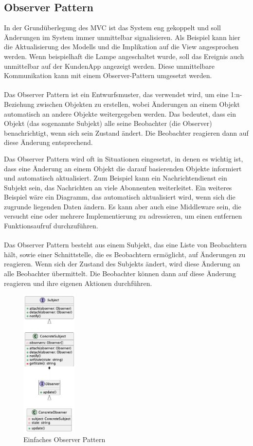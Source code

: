 \documentclass[../vs-script-first-v01.tex]{subfiles}
\begin{document}
\subsection{Observer Pattern}
In der Grundüberlegung des MVC ist das System eng gekoppelt und soll Änderungen im System immer unmittelbar signalisieren. Als Beispiel kann hier die Aktualisierung des Modells und die Implikation auf die View angesprochen werden. 
Wenn beispielhaft die Lampe angeschaltet wurde, soll das Ereignis auch unmittelbar auf der KundenApp angezeigt werden. 
Diese unmittelbare Kommunikation kann mit einem Observer-Pattern umgesetzt werden. 
\\\\
Das Observer Pattern ist ein Entwurfsmuster, das verwendet wird, um eine 1:n-Beziehung zwischen Objekten zu erstellen, wobei Änderungen an einem Objekt automatisch an andere Objekte weitergegeben werden. Das bedeutet, dass ein Objekt (das sogenannte Subjekt) alle seine Beobachter (die Observer) benachrichtigt, wenn sich sein Zustand ändert. Die Beobachter reagieren dann auf diese Änderung entsprechend.

Das Observer Pattern wird oft in Situationen eingesetzt, in denen es wichtig ist, dass eine Änderung an einem Objekt die darauf basierenden Objekte informiert und automatisch aktualisiert. Zum Beispiel kann ein Nachrichtendienst ein Subjekt sein, das Nachrichten an viele Abonnenten weiterleitet. Ein weiteres Beispiel wäre ein Diagramm, das automatisch aktualisiert wird, wenn sich die zugrunde liegenden Daten ändern. Es kann aber auch eine Middleware sein, die versucht eine oder mehrere Implementierung zu adressieren, um einen entfernen Funktionsaufruf durchzuführen. 
\\\\
Das Observer Pattern besteht aus einem Subjekt, das eine Liste von Beobachtern hält, sowie einer Schnittstelle, die es Beobachtern ermöglicht, auf Änderungen zu reagieren. Wenn sich der Zustand des Subjekts ändert, wird diese Änderung an alle Beobachter übermittelt. Die Beobachter können dann auf diese Änderung reagieren und ihre eigenen Aktionen durchführen.
\begin{figure}[ht]
  \centering
  \includegraphics[width=0.25\textwidth]{fig/uml/default-observer.png}
  \caption{Einfaches Observer Pattern}
  \label{fig:default-observer}
\end{figure}
\end{document}
